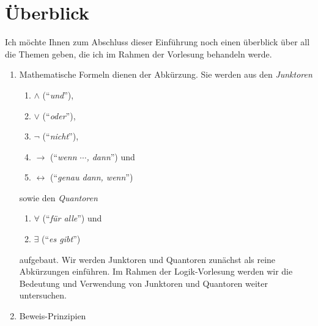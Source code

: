 
\section{\"{U}berblick}
Ich m\"{o}chte Ihnen zum Abschluss dieser Einf\"{u}hrung noch einen \"{u}berblick \"{u}ber all die Themen geben, die
ich im Rahmen der Vorlesung behandeln werde.  
\begin{enumerate}
\item Mathematische Formeln dienen der Abk\"{u}rzung.  Sie werden aus den \emph{Junktoren} 
      \begin{enumerate}
      \item $\wedge$ (``\emph{und}''),
      \item $\vee$ (``\emph{oder}''),
      \item $\neg$ (``\emph{nicht}''),
      \item $\rightarrow$ (``\emph{wenn $\cdots$, dann}'') und
      \item $\leftrightarrow$ (``\emph{genau dann, wenn}'') 
      \end{enumerate}
      sowie den \emph{Quantoren}
      \begin{enumerate}
      \item $\forall$ (``\emph{f\"{u}r alle}'') und
      \item $\exists$ (``\emph{es gibt}'') 
      \end{enumerate}
      aufgebaut.
      Wir werden  Junktoren und Quantoren zun\"{a}chst
      als reine Abk\"{u}rzungen einf\"{u}hren.  Im Rahmen der Logik-Vorlesung werden wir die Bedeutung
      und Verwendung von Junktoren und Quantoren weiter untersuchen.
\item Beweis-Prinzipien


\end{enumerate}
